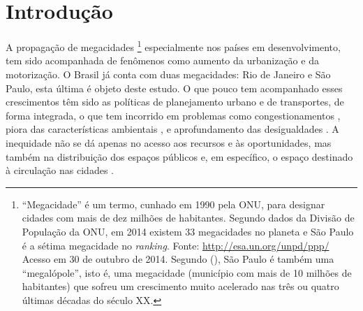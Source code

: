 \chapter{Introdução}

A propagação de megacidades
\footnote{``Megacidade'' é um termo, cunhado em 1990 pela ONU, para designar cidades com mais de dez milhões de habitantes. Segundo dados da Divisão de População da ONU, em 2014 existem 33 megacidades no planeta e São Paulo é a sétima megacidade no \emph{ranking}. Fonte: \url{http://esa.un.org/unpd/ppp/} Acesso em 30 de outubro de 2014.
Segundo  (\citeyear{FREITAG2007}), São Paulo é também uma ``megalópole'', isto é, uma megacidade (município com mais de 10 milhões de habitantes) que sofreu um crescimento muito acelerado nas três ou quatro últimas décadas do século XX.}
%
especialmente nos países em desenvolvimento, tem sido acompanhada de fenômenos como aumento da urbanização e da motorização. O Brasil já conta com duas megacidades: Rio de Janeiro e São Paulo, esta última é objeto deste estudo.
O que pouco tem acompanhado esses crescimentos têm sido as políticas de planejamento urbano e de transportes, de forma integrada, o que tem incorrido em problemas como congestionamentos \cite{KINGHAM2001,STENG2005,METZ2012}, piora das características ambientais \cite{TERTOOLEN1998,RICHARDSON2005,BANISTER2011}, e aprofundamento das desigualdades \cite{HODGE1995,AHMED2008,LEWIS2011}.
A inequidade não se dá apenas no acesso aos recursos e às oportunidades, mas também na distribuição dos espaços públicos \cite{ALVA1997} e, em específico, o espaço destinado à circulação nas cidades \cite{VASCONCELLOS2012}.

